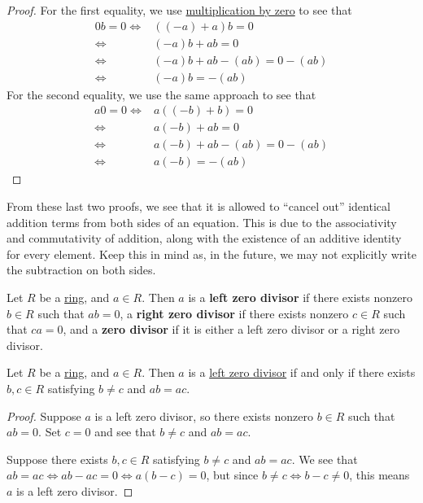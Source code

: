 \documentclass{scrartcl}
\begin{document}
\begin{proof}
    For the first equality, we use \hyperref[prop:multiply by zero]{multiplication by zero} to see that
    \begin{align}
        0b=0
        \iff& ((-a)+a)b=0 \\
        \iff& (-a)b+ab=0 \\
        \iff& (-a)b+ab-(ab)=0-(ab) \\
        \iff& (-a)b=-(ab)
    \end{align}
    For the second equality, we use the same approach to see that
    \begin{align}
        a0=0
        \iff& a((-b)+b)=0 \\
        \iff& a(-b)+ab=0 \\
        \iff& a(-b)+ab-(ab)=0-(ab) \\
        \iff& a(-b)=-(ab)
    \end{align}
\end{proof}

From these last two proofs, we see that it is allowed to ``cancel out'' identical addition terms from both sides of an
equation.
This is due to the associativity and commutativity of addition, along with the existence of an additive identity for
every element.
Keep this in mind as, in the future, we may not explicitly write the subtraction on both sides.

\begin{definition}
    \label{def:zero divisor}
    Let $R$ be a \hyperref[def:ring]{ring}, and $a\in R$.
    Then $a$ is a \textbf{left zero divisor} if there exists nonzero $b\in R$ such that $ab=0$, a
    \textbf{right zero divisor} if there exists nonzero $c\in R$ such that $ca=0$, and a \textbf{zero divisor} if it is
    either a left zero divisor or a right zero divisor.
\end{definition}

\begin{proposition}
    \label{prop:cancellation iff not zero divisor}
    Let $R$ be a \hyperref[def:ring]{ring}, and $a\in R$.
    Then $a$ is a \hyperref[def:zero divisor]{left zero divisor} if and only if there exists $b,c\in R$ satisfying
    $b\neq c$ and $ab=ac$.
\end{proposition}

\begin{proof}
    Suppose $a$ is a left zero divisor, so there exists nonzero $b\in R$ such that $ab=0$.
    Set $c=0$ and see that $b\neq c$ and $ab=ac$.

    Suppose there exists $b,c\in R$ satisfying $b\neq c$ and $ab=ac$.
    We see that $ab=ac\iff ab-ac=0\iff a(b-c)=0$, but since $b\neq c\iff b-c\neq 0$, this means $a$ is a left zero
    divisor.
\end{proof}
\end{document}
